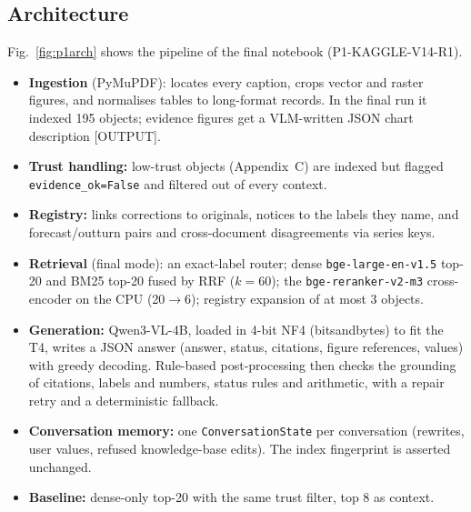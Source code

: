 \documentclass[conference]{IEEEtran}
\begin{document}
\subsection{Architecture}
Fig.~\ref{fig:p1arch} shows the pipeline of the final notebook (P1-KAGGLE-V14-R1).
\begin{itemize}
\item \textbf{Ingestion} (PyMuPDF): locates every caption, crops vector and raster figures, and normalises tables to long-format records. In the final run it indexed 195 objects; evidence figures get a VLM-written JSON chart description [OUTPUT].
\item \textbf{Trust handling:} low-trust objects (Appendix~C) are indexed but flagged \texttt{evidence\_ok=False} and filtered out of every context.
\item \textbf{Registry:} links corrections to originals, notices to the labels they name, and forecast/outturn pairs and cross-document disagreements via series keys.
\item \textbf{Retrieval} (final mode): an exact-label router; dense \texttt{bge-large-en-v1.5} top-20 and BM25 top-20 fused by RRF ($k{=}60$); the \texttt{bge-reranker-v2-m3} cross-encoder on the CPU (20$\rightarrow$6); registry expansion of at most 3 objects.
\item \textbf{Generation:} Qwen3-VL-4B, loaded in 4-bit NF4 (bitsandbytes) to fit the T4, writes a JSON answer (answer, status, citations, figure references, values) with greedy decoding. Rule-based post-processing then checks the grounding of citations, labels and numbers, status rules and arithmetic, with a repair retry and a deterministic fallback.
\item \textbf{Conversation memory:} one \texttt{ConversationState} per conversation (rewrites, user values, refused knowledge-base edits). The index fingerprint is asserted unchanged.
\item \textbf{Baseline:} dense-only top-20 with the same trust filter, top 8 as context.
\end{itemize}
\end{document}

